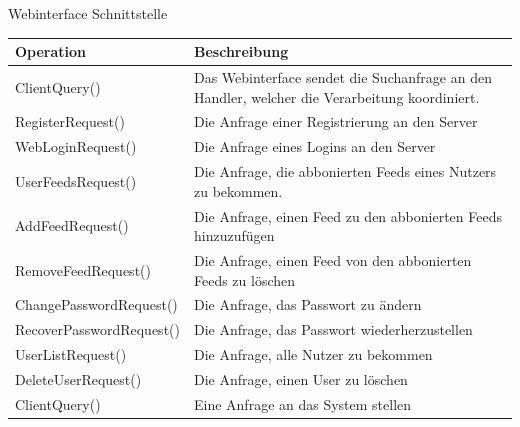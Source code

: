\begin{interface}{20}{Webinterface Schnittstelle}
\begin{tabular}{|p{5cm}|p{9cm}|}
\hline
Operation & Beschreibung\\
\hline
ClientQuery() & Das Webinterface sendet die Suchanfrage an den Handler,
welcher die Verarbeitung koordiniert.\\
\hline
RegisterRequest() & Die Anfrage einer Registrierung an den Server\\
\hline
WebLoginRequest() & Die Anfrage eines Logins an den Server\\
\hline
UserFeedsRequest() & Die Anfrage, die abbonierten Feeds eines Nutzers zu
bekommen.\\
\hline
AddFeedRequest() & Die Anfrage, einen Feed zu den abbonierten Feeds hinzuzufügen\\
\hline
RemoveFeedRequest() & Die Anfrage, einen Feed von den abbonierten Feeds zu
löschen\\
\hline
ChangePasswordRequest() & Die Anfrage, das Passwort zu ändern\\
\hline
RecoverPasswordRequest() & Die Anfrage, das Passwort wiederherzustellen\\
\hline
UserListRequest() & Die Anfrage, alle Nutzer zu bekommen\\
\hline
DeleteUserRequest() & Die Anfrage, einen User zu löschen\\
\hline
ClientQuery() & Eine Anfrage an das System stellen\\
\hline
\end{tabular}
\end{interface}

